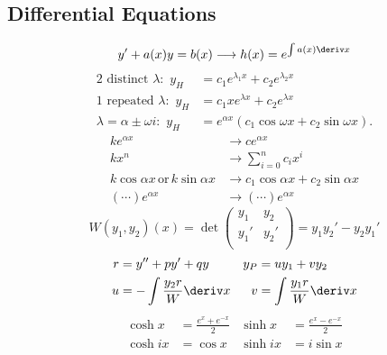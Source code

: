 \documentclass[10pt, a4paper]{article}
\begin{document}

\begin{landscape}
\begin{multicols}{3}

    \section{Differential Equations}

    \[y' + a(x) y = b(x) \longrightarrow h(x) = e^{\int a(x) \deriv x}\]
    \begin{align*}
        \text{2 distinct \(\lambda\):} \enspace y_{H} &= c_1 e^{\lambda_{1} x} + c_2 e^{\lambda_{2} x} \\
        \text{1 repeated \(\lambda\):} \enspace y_{H} &= c_1 x e^{\lambda x} + c_2 e ^{\lambda x} \\
        \lambda = \alpha \pm \omega i\text{:} \enspace y_{H} &= e^{\alpha x} \left(c_1 \cos \omega x + c_2 \sin \omega x\right).
    \end{align*}
    \begin{align*}
        k e^{\alpha x} &\longrightarrow ce^{\alpha x} \\
        k x^{n} &\longrightarrow \sum_{i=0}^{n} c_{i} x^{i} \\
        k \cos \alpha x \,\text{or}\, k \sin \alpha x &\longrightarrow c_1 \cos \alpha x + c_2 \sin \alpha x \\
        \left(\cdots\right) e^{\alpha x} &\longrightarrow \left(\cdots\right) e^{\alpha x}
    \end{align*}
    \[W(y_1, y_2)(x) = \det \begin{pmatrix}
        y_1 & y_2 \\ 
        y_1' & y_2' \\ 
    \end{pmatrix} = y_1 y_2' - y_2 y_1'\]
    \begin{align*}
        r &= y'' + py' + qy & y_{P} &= uy_1 + vy_2 \\
        u &= - \int \frac{y_2 r}{W} \deriv x & v &= \int \frac{y_1 r}{W} \deriv x
    \end{align*}
    \begin{align*}
        \cosh x &= \frac{e^x + e^{-x}}{2} & \sinh x &= \frac{e^x - e^{-x}}{2} \\
        \cosh ix &= \cos x & \sinh ix &= i \sin x
    \end{align*}


\end{multicols}
\end{landscape}
\end{document}
